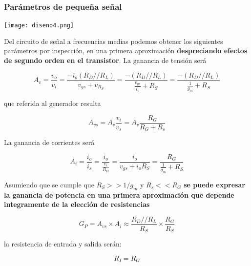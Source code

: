 \begin{multicols}{2}
        \subsubsection{Parámetros de pequeña señal}



        \begin{center}
                   \texttt{[image: diseno4.png]}
                   \label{fig:circuito_señal}
        \end{center}



        Del circuito de señal a frecuencias medias podemos obtener los siguientes parámetros por inspección, en una primera aproximación \textbf{despreciando efectos de segundo orden en el transistor}.
        La ganancia de tensión será

        \begin{equation}
        A_v = \frac{v_o}{v_i} = \frac{-i_o(R_D // R_L)}{v_{gs}+ v_{R_S}} = \frac{-(R_D//R_L)}{\frac{v_{gs}}{i_o}+R_S} = \frac{-(R_D//R_L)}{\frac{1}{g_m}+R_S}
        \end{equation}

        que referida al generador resulta

        \begin{equation}
        A_{vs} = A_v \frac{v_i}{v_s} = A_v \frac{R_G}{R_G + R_s}
        \end{equation}

        La ganancia de corrientes será

        \begin{equation}
        A_i = \frac{i_o}{i_s} = \frac{i_o}{\frac{v_i}{R_G}} = \frac{i_o}{v_{gs}+i_o R_S} = \frac{R_G}{\frac{1}{g_m}+R_S}
        \end{equation}

        Asumiendo que se cumple que $R_S >> 1/g_m$ y $R_s << R_G$ \textbf{se puede expresar la ganancia de potencia en una primera aproximación que depende integramente de la elección de resistencias}

        \begin{equation}
        G_P = A_{vs}\times A_i \approx \frac{R_D//R_L}{R_S} \times \frac{R_G}{R_S}
        \end{equation}


        la resistencia de entrada y salida serán:

        \begin{equation}
        R_I = R_G
        \end{equation}


\end{multicols}
